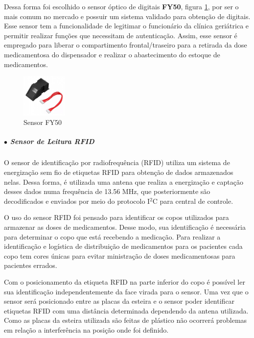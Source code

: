     Dessa forma foi escolhido o sensor óptico de digitais \textbf{FY50}, figura \ref{fig:sensor_biometria}, por ser o mais comum no mercado e possuir um sistema  validado para obtenção de digitais. Esse sensor tem a funcionalidade de legitimar o funcionário da clínica geriátrica e permitir realizar funções que necessitam de autenticação. Assim, esse sensor é empregado para liberar o compartimento frontal/traseiro para a retirada da dose medicamentosa do dispensador e realizar o abastecimento do estoque de medicamentos.
    
    \begin{figure}[H]
        \centering
        \includegraphics[width=0.2\textwidth]{figuras/sensor_biometria.jpg}
        \caption{Sensor FY50}
        \label{fig:sensor_biometria}
    \end{figure}
    
    \subparagraph*{$\bullet$ Sensor de Leitura RFID} \hfill
    
    O sensor de identificação por radiofrequência (RFID) utiliza um sistema de energização sem fio de etiquetas RFID para obtenção de dados armazenados nelas. Dessa forma, é utilizada uma antena que realiza a energização e captação desses dados numa frequência de 13.56 MHz, que posteriormente são decodificados e enviados por meio do protocolo I$^2$C para central de controle. 
    
    O uso do sensor RFID foi pensado para identificar os copos utilizados para armazenar as doses de medicamentos. Desse modo, sua identificação é necessária para determinar o copo que está recebendo a medicação. Para realizar a identificação e logística de distribuição de medicamentos para os pacientes cada copo tem cores únicas para evitar ministração de doses medicamentosas para pacientes errados. 
    
    Com o posicionamento da etiqueta RFID na parte inferior do copo é possível ler sua identificação independentemente da face virada para o sensor. Uma vez que o sensor será posicionado entre as placas da esteira e o sensor poder identificar etiquetas RFID com uma distância determinada dependendo da antena utilizada. Como as placas da esteira utilizada são feitas de plástico não ocorrerá problemas em relação a interferência na posição onde foi definido. 
    
